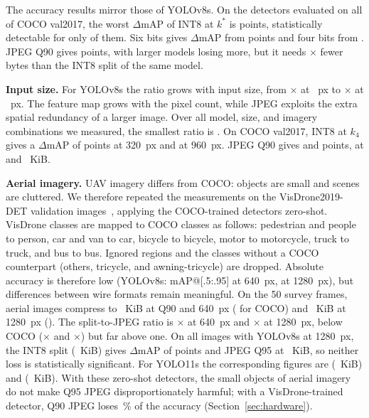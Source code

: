 \documentclass[journal,twocolumn,10pt]{IEEEtran}
\begin{document}
The accuracy results mirror those of YOLOv8s. On the \GenNAccModels{} detectors evaluated on all of COCO val2017, the worst $\Delta$mAP of INT8 at $k^\ast$ is \GenIntEightWorst{} points, statistically detectable for only \GenIntEightSignificant{} of them. Six bits gives $\Delta$mAP from \GenIntSixRange{} points and four bits from \GenIntFourRange{}. JPEG Q90 gives \GenJpegNinetyRange{} points, with larger models losing more, but it needs \GenAccWireRatioRange$\times$ fewer bytes than the INT8 split of the same model.

\textbf{Input size.} For YOLOv8s the ratio grows with input size, from \GenResRatioSmall$\times$ at \GenResSizeSmall~px to \GenResRatioLarge$\times$ at \GenResSizeLarge~px. The feature map grows with the pixel count, while JPEG exploits the extra spatial redundancy of a larger image. Over all \GenNSurveyRows{} model, size, and imagery combinations we measured, the smallest ratio is \GenResMinRatioAllModels. On COCO val2017, INT8 at $k_4$ gives a $\Delta$mAP of \GenResThreeTwentyIntEight{} points at 320~px and \GenResNineSixtyIntEight{} at 960~px. JPEG Q90 gives \GenResThreeTwentyJpegNinety{} and \GenResNineSixtyJpegNinety{} points, at \GenResThreeTwentyJpegNinetyKiB{} and \GenResNineSixtyJpegNinetyKiB~KiB.

\textbf{Aerial imagery.} UAV imagery differs from COCO: objects are small and scenes are cluttered. We therefore repeated the measurements on the \GenAerialValImages{} VisDrone2019-DET validation images~\cite{zhu2022visdrone}, applying the COCO-trained detectors zero-shot. VisDrone classes are mapped to COCO classes as follows: pedestrian and people to person, car and van to car, bicycle to bicycle, motor to motorcycle, truck to truck, and bus to bus. Ignored regions and the classes without a COCO counterpart (others, tricycle, and awning-tricycle) are dropped. Absolute accuracy is therefore low (YOLOv8s: \GenAerialBaseVEightSLow{} mAP@[.5:.95] at 640~px, \GenAerialBaseVEightSHigh{} at 1280~px), but differences between wire formats remain meaningful. On the 50 survey frames, aerial images compress to \GenAerialJpegKiBLow{}~KiB at Q90 and 640~px (\GenCocoJpegKiBLow{} for COCO) and \GenAerialJpegKiBHigh{}~KiB at 1280~px (\GenCocoJpegKiBHigh{}). The split-to-JPEG ratio is \GenAerialRatioLow$\times$ at 640~px and \GenAerialRatioHigh$\times$ at 1280~px, below COCO (\GenCocoRatioLow$\times$ and \GenCocoRatioHigh$\times$) but far above one. On all \GenAerialValImages{} images with YOLOv8s at 1280~px, the INT8 split (\GenAerialIntEightVEightSHighKiB~KiB) gives $\Delta$mAP of \GenAerialIntEightVEightSHigh{} points and JPEG Q95 \GenAerialJpegNinetyFiveVEightSHigh{} at \GenAerialJpegNinetyFiveVEightSHighKiB~KiB, so neither loss is statistically significant. For YOLO11s the corresponding figures are \GenAerialIntEightElevenSHigh{} (\GenAerialIntEightElevenSHighKiB~KiB) and \GenAerialJpegNinetyFiveElevenSHigh{} (\GenAerialJpegNinetyFiveElevenSHighKiB~KiB). With these zero-shot detectors, the small objects of aerial imagery do not make Q95 JPEG disproportionately harmful; with a VisDrone-trained detector, Q90 JPEG loses \HwVdJpegNinetyPct\,\% of the accuracy (Section~\ref{sec:hardware}).
\end{document}
